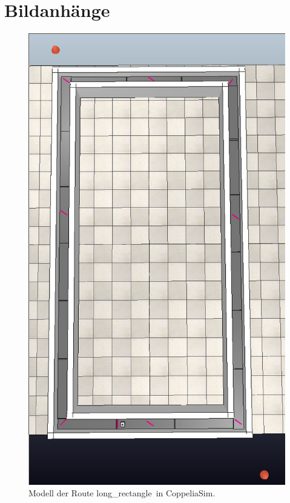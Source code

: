 \chapter{Bildanhänge}

\begin{figure}[h!]
    \centering
    \includegraphics[angle=90, width=\linewidth]{images/long_rectangle.png}
    \caption{Modell der Route \glqq long\_rectangle\grqq\ in CoppeliaSim.}
    \label{fig:long_rectangle}
\end{figure}


